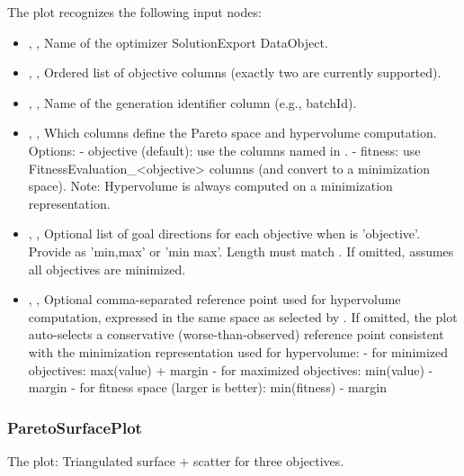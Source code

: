 The  plot recognizes the following input nodes:
\begin{itemize}
  \item {}, , Name of the optimizer SolutionExport DataObject.
  \item {}, , Ordered list of objective columns (exactly two are currently supported).
  \item {}, , Name of the generation identifier column (e.g., batchId).
  \item {}, , Which columns define the Pareto space and hypervolume computation. Options: - objective (default): use the columns named in . - fitness: use FitnessEvaluation\_\textless{}objective\textgreater{} columns (and convert to a minimization space). Note: Hypervolume is always computed on a minimization representation.
  \item {}, , Optional list of goal directions for each objective when  is 'objective'. Provide as 'min,max' or 'min max'. Length must match . If omitted, assumes all objectives are minimized.
  \item {}, , Optional comma-separated reference point used for hypervolume computation, expressed in the same space as selected by . If omitted, the plot auto-selects a conservative (worse-than-observed) reference point consistent with the minimization representation used for hypervolume: - for minimized objectives: max(value) + margin - for maximized objectives: min(value) - margin - for fitness space (larger is better): min(fitness) - margin
\end{itemize}

\subsubsection{ParetoSurfacePlot}
The   plot: Triangulated surface + scatter for three objectives.


